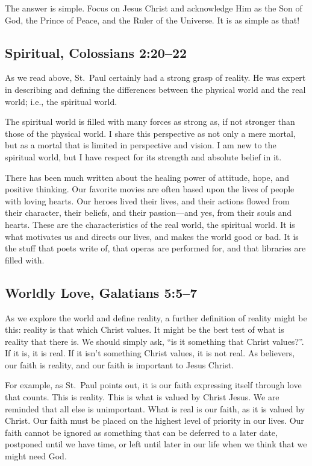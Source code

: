 \documentclass[12pt]{memoir}
\begin{document}
The answer is simple. Focus on Jesus Christ and acknowledge Him as
the Son of God, the Prince of Peace, and the Ruler of the Universe.
It is as simple as that!

\subsection[Spiritual]{Spiritual, Colossians 2:20--22}

As we read above, St.~Paul certainly had a strong grasp of reality.
He was expert in describing and defining the differences between the
physical world and the real world; i.e., the spiritual world. 

The spiritual world is filled with many forces as strong as, if not
stronger than those of the physical world. I share this perspective
as not only a mere mortal, but as a mortal that is limited in perspective
and vision. I am new to the spiritual world, but I have respect for
its strength and absolute belief in it. 

There has been much written about the healing power of attitude,
hope, and positive thinking. Our favorite movies are often
based upon the lives of people with loving hearts. Our heroes lived
their lives, and their actions flowed from their character, their
beliefs, and their passion---and yes, from their souls and hearts.
These are the characteristics of the real world, the spiritual world.
It is what motivates us and directs our lives, and makes the world
good or bad. It is the stuff that poets write of, that operas are
performed for, and that libraries are filled with. 

\subsection[Worldly Love, Galatians]{Worldly Love, Galatians 5:5--7}

As we explore the world and define reality, a further definition of reality might be this: reality is that which Christ values. It might be the best test of what is reality that there is. We should simply ask, ``is it something that
Christ values?''. If it is, it is real. If it isn't something Christ values, it is not real.
As believers, our faith is reality, and our faith is important to Jesus Christ.

For example,  as St.~Paul points out, it is our faith expressing itself through love that counts. This is reality. This is what is valued by Christ Jesus. We are reminded that all else is unimportant. What is
real is our faith, as it is valued by Christ. Our faith must be placed
on the highest level of priority in our lives. Our faith cannot be
ignored as something that can be deferred to a later date, postponed
until we have time, or left until later in our life when we think
that we might need God. 
\end{document}
